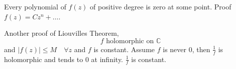 \documentclass[letter]{article}
\begin{document}
Every polynomial of $f(z)$ of positive degree is zero at some point. Proof $f(z) = C z^{n} + \ldots $. 

Another proof of Liouvilles Theorem,
\[
f \text{ holomorphic on } \mathbb{C}
\] 
and $|f(z)| \le M \quad \forall z$ and $f$ is constant.  Assume $f$ is never $0$, then $\frac{1}{f} $ is holomorphic and tends to $0$ at infinity. $\frac{1}{f}$ is constant. 
\end{document}
